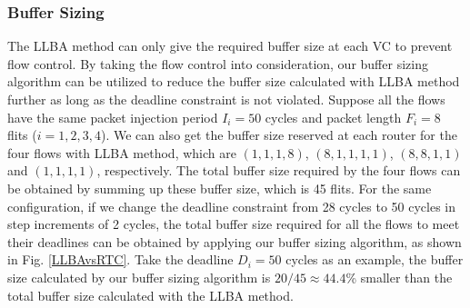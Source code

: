 \documentclass[10pt,journal]{IEEEtran}
\begin{document}
\subsubsection{Buffer Sizing}
The LLBA method \cite{189} can only give the required buffer size at each VC to prevent flow control. By taking the flow control into consideration, our buffer sizing algorithm can be utilized to reduce the buffer size calculated with LLBA method further as long as the deadline constraint is not violated. Suppose all the flows have the same packet injection period $I_i=50$ cycles and packet length $F_i=8$ flits ($i=1,2,3,4$). We can also get the buffer size reserved at each router for the four flows with LLBA method, which are $(1,1,1,8)$, $(8,1,1,1,1)$, $(8,8,1,1)$ and $(1,1,1,1)$, respectively. The total buffer size required by the four flows can be obtained by summing up these buffer size, which is 45 flits. For the same configuration, if we change the deadline constraint from 28 cycles to 50 cycles in step increments of 2 cycles, the total buffer size required for all the flows to meet their deadlines can be obtained by applying our buffer sizing algorithm, as shown in Fig. \ref{LLBAvsRTC}. Take the deadline $D_i=50$ cycles as an example, the buffer size calculated by our buffer sizing algorithm is $20/45\approx44.4$\% smaller than the total buffer size calculated with the LLBA method.
\end{document}
